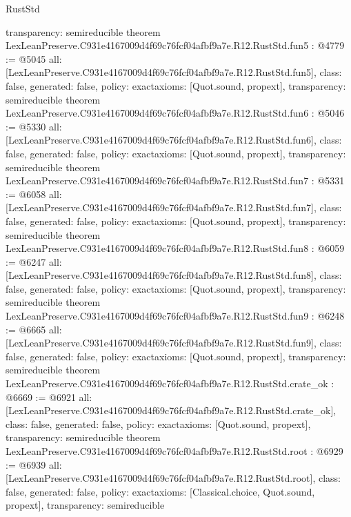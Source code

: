 \begin{lexlean}{RustStd}
\begin{coremodule}
{  transparency: semireducible
}
theorem LexLeanPreserve.C931e4167009d4f69c76fcf04afbf9a7e.R12.RustStd.fun5 : @4779 := @5045 {
  all: [LexLeanPreserve.C931e4167009d4f69c76fcf04afbf9a7e.R12.RustStd.fun5],
  class: false,
  generated: false,
  policy: exact{axioms: [Quot.sound, propext]},
  transparency: semireducible
}
theorem LexLeanPreserve.C931e4167009d4f69c76fcf04afbf9a7e.R12.RustStd.fun6 : @5046 := @5330 {
  all: [LexLeanPreserve.C931e4167009d4f69c76fcf04afbf9a7e.R12.RustStd.fun6],
  class: false,
  generated: false,
  policy: exact{axioms: [Quot.sound, propext]},
  transparency: semireducible
}
theorem LexLeanPreserve.C931e4167009d4f69c76fcf04afbf9a7e.R12.RustStd.fun7 : @5331 := @6058 {
  all: [LexLeanPreserve.C931e4167009d4f69c76fcf04afbf9a7e.R12.RustStd.fun7],
  class: false,
  generated: false,
  policy: exact{axioms: [Quot.sound, propext]},
  transparency: semireducible
}
theorem LexLeanPreserve.C931e4167009d4f69c76fcf04afbf9a7e.R12.RustStd.fun8 : @6059 := @6247 {
  all: [LexLeanPreserve.C931e4167009d4f69c76fcf04afbf9a7e.R12.RustStd.fun8],
  class: false,
  generated: false,
  policy: exact{axioms: [Quot.sound, propext]},
  transparency: semireducible
}
theorem LexLeanPreserve.C931e4167009d4f69c76fcf04afbf9a7e.R12.RustStd.fun9 : @6248 := @6665 {
  all: [LexLeanPreserve.C931e4167009d4f69c76fcf04afbf9a7e.R12.RustStd.fun9],
  class: false,
  generated: false,
  policy: exact{axioms: [Quot.sound, propext]},
  transparency: semireducible
}
theorem LexLeanPreserve.C931e4167009d4f69c76fcf04afbf9a7e.R12.RustStd.crate_ok : @6669 := @6921 {
  all: [LexLeanPreserve.C931e4167009d4f69c76fcf04afbf9a7e.R12.RustStd.crate_ok],
  class: false,
  generated: false,
  policy: exact{axioms: [Quot.sound, propext]},
  transparency: semireducible
}
theorem LexLeanPreserve.C931e4167009d4f69c76fcf04afbf9a7e.R12.RustStd.root : @6929 := @6939 {
  all: [LexLeanPreserve.C931e4167009d4f69c76fcf04afbf9a7e.R12.RustStd.root],
  class: false,
  generated: false,
  policy: exact{axioms: [Classical.choice, Quot.sound, propext]},
  transparency: semireducible
}


\end{coremodule}
\end{lexlean}
